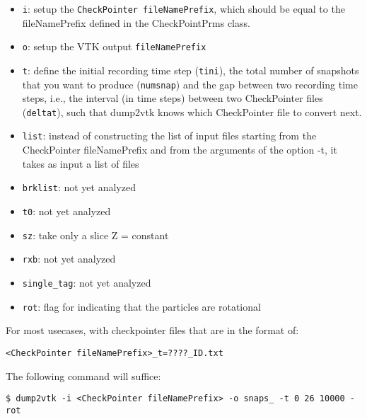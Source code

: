 \begin{itemize}
\item \lstinline{i}: setup the \lstinline{CheckPointer fileNamePrefix}, which should be equal to the fileNamePrefix defined in the CheckPointPrms class.

\item \lstinline{o}: setup the VTK output \lstinline{fileNamePrefix}

\item \lstinline{t}: define the initial recording time step (\lstinline{tini}), the total number of snapshots that you want to produce (\lstinline{numsnap}) and the gap between two recording time steps, i.e., the interval (in time steps) between two CheckPointer files (\lstinline{deltat}), such that dump2vtk knows which CheckPointer file to convert next.

\item \lstinline{list}: instead of constructing the list of input files starting from the CheckPointer fileNamePrefix and from the arguments of the option -t, it takes as input a list of files

\item \lstinline{brklist}: not yet analyzed

\item \lstinline{t0}: not yet analyzed

\item \lstinline{sz}: take only a slice Z = constant

\item \lstinline{rxb}: not yet analyzed

\item \lstinline{single_tag}: not yet analyzed

\item \lstinline{rot}: flag for indicating that the particles are rotational 
\end{itemize}

For most usecases, with checkpointer files that are in the format of:
\begin{centering}
    \lstinline{<CheckPointer fileNamePrefix>_t=????_ID.txt}
\end{centering}

The following command will suffice:
\begin{lstlisting}[style=inlineBash]
$ dump2vtk -i <CheckPointer fileNamePrefix> -o snaps_ -t 0 26 10000 -rot
\end{lstlisting}